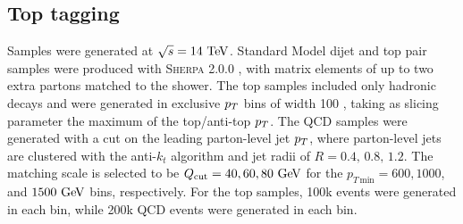 \subsection{Top tagging} \label{sec:top-samples}
Samples were generated at $\sqrt{s}=14\TeV$. Standard Model dijet and top pair
samples were produced with \textsc{Sherpa} 2.0.0 \cite{Gleisberg:2008ta,Schumann:2007mg,Krauss:2001iv,Gleisberg:2008fv,Hoeche:2009rj,Schonherr:2008av}, with matrix elements of up
to two extra partons matched to the shower. The top samples  included only
hadronic decays and  were generated in exclusive $p_T$ bins of width 100 \GeV,
taking as slicing parameter the maximum of the top/anti-top $p_T$. The QCD samples 
 were generated with a cut on the leading parton-level jet $p_T$, where
parton-level jets are clustered with the anti-$k_t$ algorithm and jet radii of
$R= 0.4,\,0.8,\,1.2$. The matching scale is selected to be $Q_{\rm cut}=40, 60, 80 \GeV$ for
the $p_{T\,\text{min}}=600, 1000$, and $1500 \GeV$ bins, respectively. For the top samples, 100k 
events were generated in each bin, while 200k QCD events were generated in each bin.
